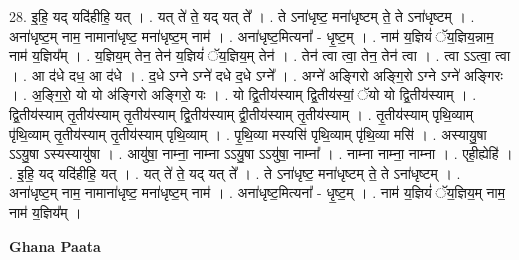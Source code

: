 \documentclass[17pt]{extarticle}
\begin{document}
28. इ॒हि॒ यद् यदि॑हीहि॒ यत् । . यत् ते॑ ते॒ यद् यत् ते᳚ । . ते ऽना॑धृष्ट॒ मना॑धृष्टम् ते॒ ते ऽना॑धृष्टम् । . अना॑धृष्ट॒म् नाम॒ नामाना॑धृष्ट॒ मना॑धृष्ट॒म् नाम॑ । . अना॑धृष्ट॒मित्यना᳚ - धृ॒ष्ट॒म् । . नाम॑ य॒ज्ञियं॑ ॅय॒ज्ञिय॒न्नाम॒ नाम॑ य॒ज्ञिय᳚म् । . य॒ज्ञिय॒म् तेन॒ तेन॑ य॒ज्ञियं॑ ॅय॒ज्ञिय॒म् तेन॑ । . तेन॑ त्वा त्वा॒ तेन॒ तेन॑ त्वा । . त्वा ऽऽत्वा॒ त्वा । . आ द॑धे दध॒ आ द॑धे । . द॒धे ऽग्ने ऽग्ने॑ दधे द॒धे ऽग्ने᳚ । . अग्ने॑ अङ्गिरो अङ्गि॒रो ऽग्ने ऽग्ने॑ अङ्गिरः । . अ॒ङ्गि॒रो॒ यो यो अ॑ङ्गिरो अङ्गिरो॒ यः । . यो द्वि॒तीय॑स्याम् द्वि॒तीय॑स्यां॒ ॅयो यो द्वि॒तीय॑स्याम् । . द्वि॒तीय॑स्याम् तृ॒तीय॑स्याम् तृ॒तीय॑स्याम् द्वि॒तीय॑स्याम् द्वी॒तीय॑स्याम् तृ॒तीय॑स्याम् । . तृ॒तीय॑स्याम् पृथि॒व्याम् पृ॑थि॒व्याम् तृ॒तीय॑स्याम् तृ॒तीय॑स्याम् पृथि॒व्याम् । . पृ॒थि॒व्या मस्यसि॑ पृथि॒व्याम् पृ॑थि॒व्या मसि॑ । . अस्यायु॒षा ऽऽयु॒षा ऽस्यस्यायु॑षा । . आयु॑षा॒ नाम्ना॒ नाम्ना ऽऽयु॒षा ऽऽयु॑षा॒ नाम्ना᳚ । . नाम्ना नाम्ना॒ नाम्ना । . एही॒ह्येहि॑ । . इ॒हि॒ यद् यदि॑हीहि॒ यत् । . यत् ते॑ ते॒ यद् यत् ते᳚ । . ते ऽना॑धृष्ट॒ मना॑धृष्टम् ते॒ ते ऽना॑धृष्टम् । . अना॑धृष्ट॒म् नाम॒ नामाना॑धृष्ट॒ मना॑धृष्ट॒म् नाम॑ । . अना॑धृष्ट॒मित्यना᳚ - धृ॒ष्ट॒म् । . नाम॑ य॒ज्ञियं॑ ॅय॒ज्ञिय॒म् नाम॒ नाम॑ य॒ज्ञिय᳚म् । \newline

\textbf{Ghana Paata } \newline
\end{document}
